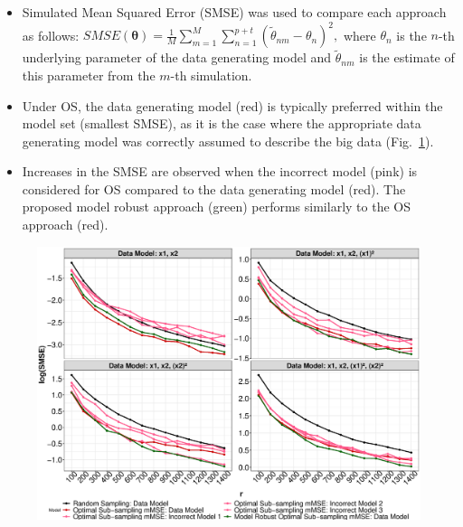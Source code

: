 \documentclass[a0paper,portrait]{baposter}
\begin{document}
\begin{poster}
{\begin{itemize}[leftmargin=*,itemsep=-3pt,topsep=-3pt]
            \item Simulated Mean Squared Error (SMSE) was used to compare each approach as follows: $SMSE(\bm{\theta}) = \frac{1}{M}{\sum_{m=1}^{M} \sum_{n=1}^{p+t} (\tilde{\theta}_{nm} - \theta_n)^2 },$ where $\theta_n$ is the $n$-th underlying parameter of the data generating model and $\tilde{\theta}_{nm}$ is the estimate of this parameter from the $m$-th simulation.
            \item Under OS, the data generating model (red) is typically preferred within the model set (smallest SMSE), as it is the case where the appropriate data generating model was correctly assumed to describe the big data (Fig.~\ref{Fig:1}).
            \item Increases in the SMSE are observed when the incorrect model (pink) is considered for OS compared to the data generating model (red). The proposed model robust approach (green) performs similarly to the OS approach (red). 
        \end{itemize}
        \begin{figure}[H]
            \centering
            \includegraphics[width=\textwidth,keepaspectratio]{Poster_SMSE_LR_TV_Exp_mMSE.eps}\vspace{-0.3cm}
            \caption{}\label{Fig:1}
        \end{figure}
}


\end{poster}
\end{document}
